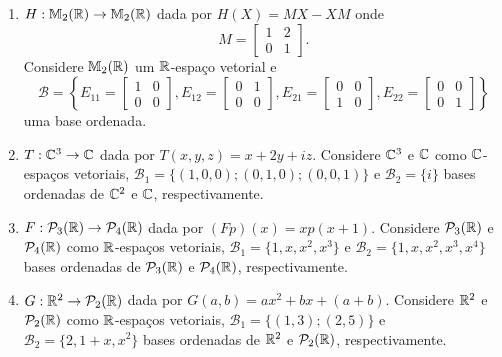 \documentclass[12pt]{exam}
\begin{document}
\begin{exercicio}
\begin{enumerate}[label={\alph*})]
        \item $H : \mathbb{M}_2(\mathbb{R}) \to \mathbb{M}_2(\mathbb{R})$ dada por $H(X) = MX - XM$ onde
        \[
        M = \begin{bmatrix}
            1 & 2\\
            0 & 1
        \end{bmatrix}.
        \]
        Considere $\mathbb{M}_2(\mathbb{R})$ um $\mathbb{R}$-espaço vetorial e
        \[
        \mathcal{B} = \left\{E_{11} = \begin{bmatrix}
            1 & 0\\0 & 0
        \end{bmatrix}, E_{12} = \begin{bmatrix}
            0 & 1\\0 & 0
        \end{bmatrix}, E_{21} = \begin{bmatrix}
            0 & 0\\1 & 0
        \end{bmatrix}, E_{22} = \begin{bmatrix}
            0 & 0\\0 & 1
        \end{bmatrix}\right\}
        \]
        uma base ordenada.

        \item $T : \mathbb{C}^3 \to \mathbb{C}$ dada por $T(x,y,z) = x + 2y + iz$. Considere $\mathbb{C}^3$ e $\mathbb{C}$ como $\mathbb{C}$-espaços vetoriais, $\mathcal{B}_1 = \{(1,0,0); (0,1,0); (0,0,1)\}$ e $\mathcal{B}_2 = \{i\}$ bases ordenadas de $\mathbb{C}^2$ e $\mathbb{C}$, respectivamente.

        \item $F : \mathcal{P}_3(\mathbb{R}) \to \mathcal{P}_4(\mathbb{R})$ dada por $(Fp)(x) = xp(x + 1)$. Considere $\mathcal{P}_3(\mathbb{R})$ e $\mathcal{P}_4(\mathbb{R})$ como $\mathbb{R}$-espaços vetoriais, $\mathcal{B}_1 = \{1, x, x^2, x^3\}$ e $\mathcal{B}_2 = \{1, x, x^2, x^3, x^4\}$ bases ordenadas de $\mathcal{P}_3(\mathbb{R})$ e $\mathcal{P}_4(\mathbb{R})$, respectivamente.

        \item $G : \mathbb{R}^2 \to \mathcal{P}_2(\mathbb{R})$ dada por $G(a,b) = ax^2 + bx + (a + b)$. Considere $\mathbb{R}^2$ e $\mathcal{P}_2(\mathbb{R})$ como $\mathbb{R}$-espaços vetoriais, $\mathcal{B}_1 = \{(1,3); (2,5)\}$ e $\mathcal{B}_2 = \{2, 1 + x, x^2\}$ bases ordenadas de $\mathbb{R}^2$ e $\mathcal{P}_2(\mathbb{R})$, respectivamente.


\end{enumerate}
\end{exercicio}
\end{document}
